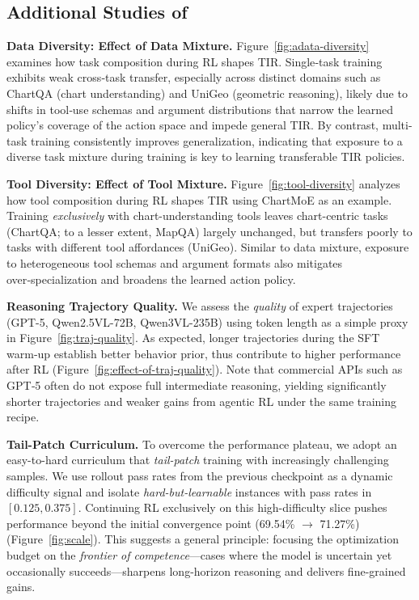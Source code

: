 \subsection{Additional Studies of \env{}}
\noindent \textbf{Data Diversity: Effect of Data Mixture.}
Figure~\ref{fig:adata-diversity} examines how task composition during RL shapes TIR. 
Single‑task training exhibits weak cross‑task transfer, especially across distinct domains such as ChartQA (chart understanding) and UniGeo (geometric reasoning), likely due to shifts in tool‑use schemas and argument distributions that narrow the learned policy’s coverage of the action space and impede general TIR. 
By contrast, multi-task training consistently improves generalization, indicating that exposure to a diverse task mixture during training is key to learning transferable TIR policies.

\noindent \textbf{Tool Diversity: Effect of Tool Mixture.}
Figure~\ref{fig:tool-diversity} analyzes how tool composition during RL shapes TIR using ChartMoE as an example. Training \emph{exclusively} with chart-understanding tools leaves chart-centric tasks (ChartQA; to a lesser extent, MapQA) largely unchanged, but transfers poorly to tasks with different tool affordances (UniGeo). Similar to data mixture, exposure to heterogeneous tool schemas and argument formats also mitigates over‑specialization and broadens the learned action policy.

\noindent \textbf{Reasoning Trajectory Quality.}
We assess the \emph{quality} of expert trajectories (GPT-5, Qwen2.5VL-72B, Qwen3VL-235B) using token length as a simple proxy in Figure~\ref{fig:traj-quality}. As expected, longer trajectories during the SFT warm‑up establish better behavior prior, thus contribute to higher performance after RL (Figure~\ref{fig:effect-of-traj-quality}). Note that commercial APIs such as GPT‑5 often do not expose full intermediate reasoning, yielding significantly shorter trajectories and weaker gains from agentic RL under the same training recipe.

\noindent \textbf{Tail-Patch Curriculum.}
To overcome the performance plateau, we adopt an easy-to-hard curriculum that \emph{tail-patch} training with increasingly challenging samples.
We use rollout pass rates from the previous checkpoint as a dynamic difficulty signal and isolate \emph{hard-but-learnable} instances with pass rates in $[0.125, 0.375]$.
Continuing RL exclusively on this high-difficulty slice pushes performance beyond the initial convergence point (69.54\% $\rightarrow$ 71.27\%) (Figure~\ref{fig:scale}).
This suggests a general principle: focusing the optimization budget on the \emph{frontier of competence}—cases where the model is uncertain yet occasionally succeeds—sharpens long-horizon reasoning and delivers fine-grained gains.


